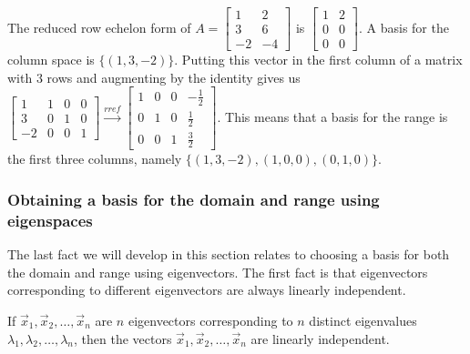 \begin{example}
The reduced row echelon form of 
$A=
\begin{bmatrix}
 1 & 2 \\
 3 & 6 \\
 -2 & -4
\end{bmatrix}
$
is
$
\begin{bmatrix}
 1 & 2 \\
 0 & 0 \\
 0 & 0
\end{bmatrix}
$.  
A basis for the column space is $\{(1,3,-2)\}$. Putting this vector in the first column of a matrix with 3 rows and augmenting by the identity gives us 
$
\begin{bmatrix}
 1 & 1 & 0 & 0 \\
 3 & 0 & 1 & 0 \\
 -2 & 0 & 0 & 1
\end{bmatrix}
\xrightarrow{rref}
\begin{bmatrix}
 1 & 0 & 0 & -\frac{1}{2} \\
 0 & 1 & 0 & \frac{1}{2} \\
 0 & 0 & 1 & \frac{3}{2}
\end{bmatrix}
$.
This means that a basis for the range is the first three columns, namely $\{(1,3,-2),(1,0,0),(0,1,0)\}$.

\end{example}

\subsubsection{Obtaining a basis for the domain and range using eigenspaces}
The last fact we will develop in this section relates to choosing a basis for both the domain and range using eigenvectors.  The first fact is that eigenvectors corresponding to different eigenvectors are always linearly independent.
\begin{theorem}
If $\vec x_1,\vec x_2,\ldots,\vec x_n$ are $n$ eigenvectors corresponding to $n$ distinct eigenvalues $\lambda_1, \lambda_2,\ldots, \lambda_n$, then the vectors $\vec x_1,\vec x_2,\ldots,\vec x_n$ are linearly independent.
\end{theorem}

